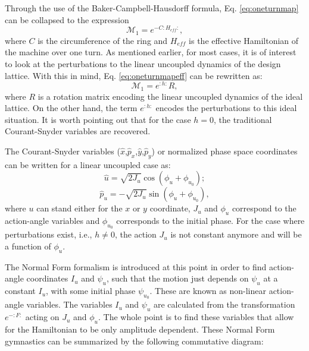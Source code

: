 Through the use of the Baker-Campbell-Hausdorff formula, Eq. \ref{eq:oneturnmap} can be collapsed to the expression 
\begin{equation}
    \label{eq:oneturnmapeff}
    \mathcal{M}_1=e^{-C :H_{eff}:},
\end{equation}
where $C$ is the circumference of the ring and $H_{eff}$ is the effective Hamiltonian of the machine over one turn. As mentioned earlier, for most cases, it is of interest to look at the perturbations to the linear uncoupled dynamics of the design lattice. With this in mind, Eq. \ref{eq:oneturnmapeff} can be rewritten as:
\begin{equation}
    \label{eq:oneturnmapeff1}
    \mathcal{M}_1=e^{:h:}R,
\end{equation}
where $R$ is a rotation matrix encoding the linear uncoupled dynamics of the ideal lattice. On the other hand, the term $e^{:h:}$ encodes the perturbations to this ideal situation. It is worth pointing out that for the case $h=0$, the traditional Courant-Snyder variables are recovered.   

The Courant-Snyder variables ($\hat{x}$,$\hat{p}_x$,$\hat{y}$,$\hat{p}_y$) or normalized phase space coordinates can be written for a linear uncoupled case as:
\begin{equation}
    \label{eq:norm1}
    \hat{u}=\sqrt{2J_u} \cos \left( \phi_u + \phi_{u_0}\right);
\end{equation}
\begin{equation}
    \label{eq:norm2}
    \hat{p}_u=-\sqrt{2J_u} \sin \left( \phi_u + \phi_{u_0}\right),
\end{equation}
where $u$ can stand either for the $x$ or $y$ coordinate, $J_u$ and $\phi_u$ correspond to the action-angle variables and $\phi_{u_0}$ corresponds to the initial phase. For the case where perturbations exist, i.e., $h \neq 0$, the action $J_u$ is not constant anymore and will be a function of $\phi_u$.  

The Normal Form formalism is introduced at this point in order to find action-angle coordinates $I_u$ and $\psi_u$, such that the motion just depends on $\psi_u$ at a constant $I_u$, with some initial phase $\psi_{u_0}$. These are known as non-linear action-angle variables. The variables $I_u$ and $\psi_u$ are calculated from the transformation $e^{-:F:}$ acting on $J_u$ and $\phi_u$. The whole point is to find these variables that allow for the Hamiltonian to be only amplitude dependent. These Normal Form gymnastics can be summarized by the following commutative diagram: 


